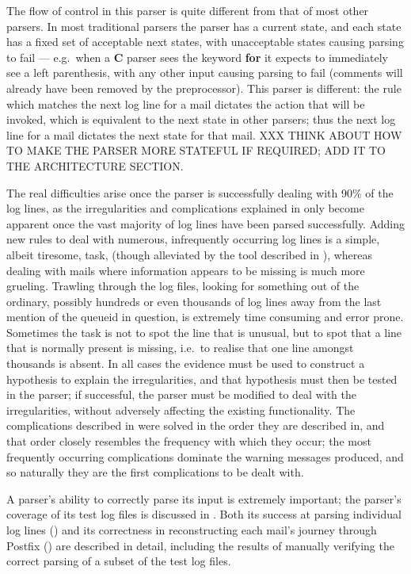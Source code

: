 The flow of control in this parser is quite different from that of most
other parsers.  In most traditional parsers the parser has a current state,
and each state has a fixed set of acceptable next states, with unacceptable
states causing parsing to fail --- e.g.\ when a \textbf{C} parser sees the
keyword \textbf{for} it expects to immediately see a left parenthesis, with
any other input causing parsing to fail (comments will already have been
removed by the preprocessor).  This parser is different: the rule which
matches the next log line for a mail dictates the action that will be
invoked, which is equivalent to the next state in other parsers; thus the
next log line for a mail dictates the next state for that mail.  XXX THINK
ABOUT HOW TO MAKE THE PARSER MORE STATEFUL IF REQUIRED\@; ADD IT TO THE
ARCHITECTURE SECTION\@.

The real difficulties arise once the parser is successfully dealing with
90\% of the log lines, as the irregularities and complications explained in
 only become apparent once the vast majority of
log lines have been parsed successfully.  Adding new rules to deal with
numerous, infrequently occurring log lines is a simple, albeit tiresome,
task, (though alleviated by the tool described in ), whereas dealing with mails where information appears to be
missing is much more grueling.  Trawling through the log files, looking for
something out of the ordinary, possibly hundreds or even thousands of log
lines away from the last mention of the queueid in question, is extremely
time consuming and error prone.  Sometimes the task is not to spot the line
that is unusual, but to spot that a line that is normally present is
missing, i.e.\ to realise that one line amongst thousands is absent.  In
all cases the evidence must be used to construct a hypothesis to explain
the irregularities, and that hypothesis must then be tested in the parser;
if successful, the parser must be modified to deal with the irregularities,
without adversely affecting the existing functionality.  The complications
described in  were solved in the order they are
described in, and that order closely resembles the frequency with which
they occur; the most frequently occurring complications dominate the
warning messages produced, and so naturally they are the first
complications to be dealt with.

A parser's ability to correctly parse its input is extremely important; the
parser's coverage of its test log files is discussed in .  Both its success at parsing individual log lines
() and its correctness in reconstructing each
mail's journey through Postfix () are described
in detail, including the results of manually verifying the correct parsing
of a subset of the test log files.

\newpage


